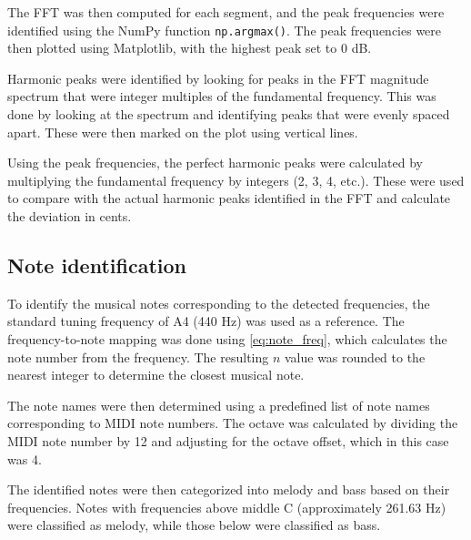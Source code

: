 The FFT was then computed for each segment, and the peak frequencies were identified using the NumPy function \texttt{np.argmax()}. The peak frequencies were then plotted using Matplotlib, with the highest peak set to 0 dB.

Harmonic peaks were identified by looking for peaks in the FFT magnitude spectrum that were integer multiples of the fundamental frequency. This was done by looking at the spectrum and identifying peaks that were evenly spaced apart. These were then marked on the plot using vertical lines.

Using the peak frequencies, the perfect harmonic peaks were calculated by multiplying the fundamental frequency by integers (2, 3, 4, etc.). These were used to compare with the actual harmonic peaks identified in the FFT and calculate the deviation in cents.

\subsection{Note identification}

To identify the musical notes corresponding to the detected frequencies, the standard tuning frequency of A4 (440 Hz) was used as a reference. The frequency-to-note mapping was done using \autoref{eq:note_freq}, which calculates the note number from the frequency. The resulting \( n \) value was rounded to the nearest integer to determine the closest musical note. 

The note names were then determined using a predefined list of note names corresponding to MIDI note numbers. The octave was calculated by dividing the MIDI note number by 12 and adjusting for the octave offset, which in this case was 4.

The identified notes were then categorized into melody and bass based on their frequencies. Notes with frequencies above middle C (approximately 261.63 Hz) were classified as melody, while those below were classified as bass. 